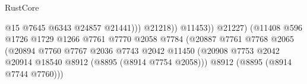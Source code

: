 \begin{lexlean}{RustCore}
\begin{coremodule}
                                                                          @15
                                                                          @7645
                                                                          @6343
                                                                          @24857
                                                                          @21441)))
                                                                    @21218))
                                                                @11453))
                                                            @21227)
                                                          (@11408
                                                            @596
                                                            @1726
                                                            @1729
                                                            @1266
                                                            @7761
                                                            @7770
                                                            @2058
                                                            @7784
                                                            (@20887
                                                              @7761
                                                              @7768
                                                              @2065
                                                              (@20894
                                                                @7760
                                                                @7767
                                                                @2036
                                                                @7743
                                                                @2042
                                                                @11450
                                                                (@20908
                                                                  @7753
                                                                  @2042
                                                                  @20914
                                                                  @18540
                                                                  @8912
                                                                  (@8895 (@8914 @7754 @2058)))
                                                                @8912
                                                                (@8895 (@8914 @7744 @7760)))

\end{coremodule}
\end{lexlean}
